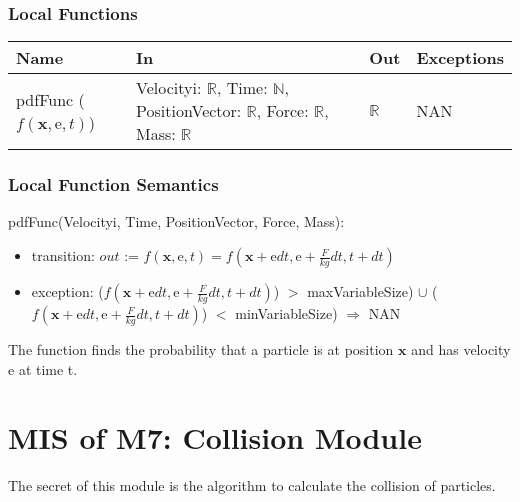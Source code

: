 \documentclass[12pt, titlepage]{article}
\begin{document}
\subsubsection{Local Functions}

\begin{center}
	\begin{tabular}{p{2cm} p{3cm} p{4cm} p{2cm}}
		\hline
		\textbf{Name} & \textbf{In} & \textbf{Out} & \textbf{Exceptions} \\
		\hline
		pdfFunc ($f(\mathrm{\textbf{x}},\mathrm{e},t)$) & Velocityi: $\mathbb{R}$, Time: $\mathbb{N}$, PositionVector: $\mathbb{R}$, Force: $\mathbb{R}$, Mass: $\mathbb{R}$ & $\mathbb{R}$ & NAN \\
		\hline
	\end{tabular}
\end{center}

\subsubsection{Local Function Semantics}

\noindent pdfFunc(Velocityi, Time, PositionVector, Force, Mass):
\begin{itemize}
	\item transition: $out$ := $f(\mathrm{\textbf{x}},\mathrm{e},t) = f(\mathrm{\textbf{x}} +\mathrm{e}dt, \mathrm{e} + \frac{F}{kg}dt, t + dt)$
	\item exception: ($f(\mathrm{\textbf{x}} +\mathrm{e}dt, \mathrm{e} + \frac{F}{kg}dt, t + dt)$) $>$ maxVariableSize) $\cup$ ($f(\mathrm{\textbf{x}} +\mathrm{e}dt, \mathrm{e} + \frac{F}{kg}dt, t + dt)$) $<$ minVariableSize) $\Rightarrow$ NAN
\end{itemize}

The function finds the probability that a particle is at position $\textbf{x}$ and has velocity $\mathrm{e}$ at time t.\\

\newpage

\section{MIS of M7: Collision Module} \label{COModule} 

The secret of this module is the algorithm to calculate the collision of particles.
\end{document}
